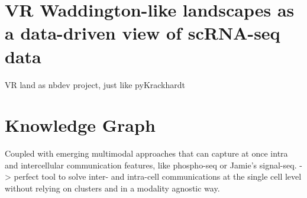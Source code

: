        
        
        

\section{VR Waddington-like landscapes as a data-driven view of scRNA-seq data}

VR land as nbdev project, just like pyKrackhardt


\section{Knowledge Graph}

Coupled with emerging multimodal approaches that can capture at once intra and intercellular communication features, like phospho-seq \cite{blair_phospho-seq_2023} or Jamie's signal-seq. -> perfect tool to solve inter- and intra-cell communications at the single cell level without relying on clusters and in a modality agnostic way. 

